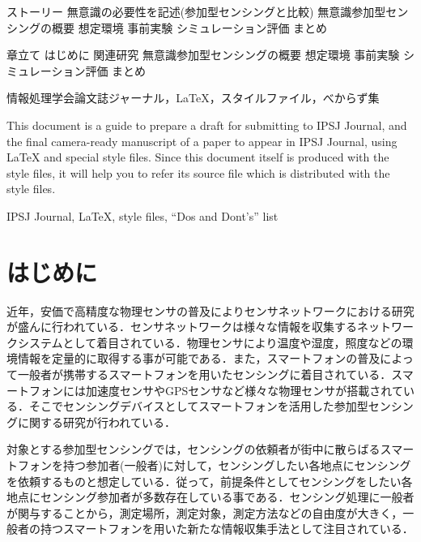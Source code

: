 \documentclass[submit,techrep]{ipsj}
\begin{document}
ストーリー
無意識の必要性を記述(参加型センシングと比較)
無意識参加型センシングの概要
	想定環境
事前実験
シミュレーション評価
まとめ

章立て
はじめに
関連研究
無意識参加型センシングの概要
	想定環境
事前実験
シミュレーション評価
まとめ



\begin{jkeyword}
情報処理学会論文誌ジャーナル，\LaTeX，スタイルファイル，べからず集
\end{jkeyword}

\begin{eabstract}
This document is a guide to prepare a draft for submitting to IPSJ
Journal, and the final camera-ready manuscript of a paper to appear in
IPSJ Journal, using {\LaTeX} and special style files.  Since this
document itself is produced with the style files, it will help you to
refer its source file which is distributed with the style files.
\end{eabstract}

\begin{ekeyword}
IPSJ Journal, \LaTeX, style files, ``Dos and Dont's'' list
\end{ekeyword}

\maketitle

\section{はじめに}


近年，安価で高精度な物理センサの普及によりセンサネットワークにおける研究が盛んに行われている．センサネットワークは様々な情報を収集するネットワークシステムとして着目されている\cite{Viani}．物理センサにより温度や湿度，照度などの環境情報を定量的に取得する事が可能である．また，スマートフォンの普及によって一般者が携帯するスマートフォンを用いたセンシングに着目されている．スマートフォンには加速度センサやGPSセンサなど様々な物理センサが搭載されている．そこでセンシングデバイスとしてスマートフォンを活用した参加型センシングに関する研究が行われている\cite{Nicholas}．

対象とする参加型センシングでは，センシングの依頼者が街中に散らばるスマートフォンを持つ参加者(一般者)に対して，センシングしたい各地点にセンシングを依頼するものと想定している\cite{Burke}．従って，前提条件としてセンシングをしたい各地点にセンシング参加者が多数存在している事である．センシング処理に一般者が関与することから，測定場所，測定対象，測定方法などの自由度が大きく，一般者の持つスマートフォンを用いた新たな情報収集手法として注目されている．
\end{document}
